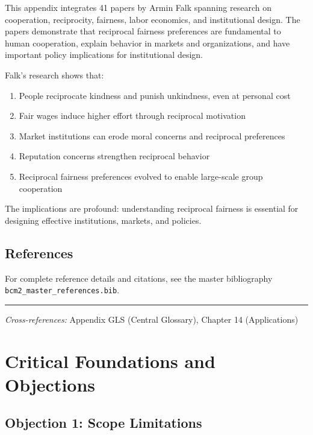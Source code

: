 This appendix integrates 41 papers by Armin Falk spanning research on
cooperation, reciprocity, fairness, labor economics, and institutional design. The papers demonstrate
that reciprocal fairness preferences are fundamental to human cooperation, explain behavior in
markets and organizations, and have important policy implications for institutional design.

Falk's research shows that:
\begin{enumerate}
  \item People reciprocate kindness and punish unkindness, even at personal cost
  \item Fair wages induce higher effort through reciprocal motivation
  \item Market institutions can erode moral concerns and reciprocal preferences
  \item Reputation concerns strengthen reciprocal behavior
  \item Reciprocal fairness preferences evolved to enable large-scale group cooperation
\end{enumerate}

The implications are profound: understanding reciprocal fairness is essential for designing
effective institutions, markets, and policies.

\subsection{References}

For complete reference details and citations, see the master bibliography
\texttt{bcm2\_master\_references.bib}.

\vspace{1em}
\hrule
\vspace{0.5em}

\noindent\textit{Cross-references:}
Appendix GLS (Central Glossary), Chapter 14 (Applications)



\section{Critical Foundations and Objections}
\label{sec:fal-foundations}

\subsection{Objection 1: Scope Limitations}


